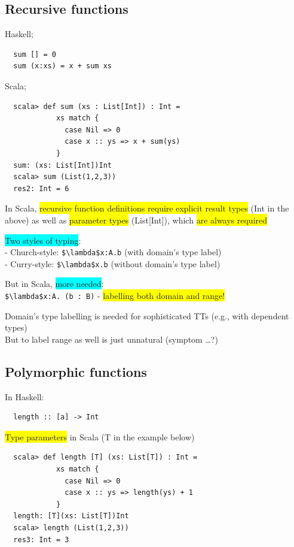 \documentclass[tikz,border=10pt]{project_plan}
\begin{document}
\subsection{Recursive functions}

Haskell;
\begin{lstlisting}
  sum [] = 0
  sum (x:xs) = x + sum xs
\end{lstlisting}

Scala;
\begin{lstlisting}
  scala> def sum (xs : List[Int]) : Int =
            xs match {
              case Nil => 0
              case x :: ys => x + sum(ys)
            }
  sum: (xs: List[Int])Int
  scala> sum (List(1,2,3))
  res2: Int = 6
\end{lstlisting}
In Scala, \colorbox{yellow}{recursive function definitions require explicit result types} (Int in the above) as well as \colorbox{yellow}{parameter types}
(List[Int]), which \colorbox{yellow}{are always required}

\colorbox{cyan}{Two styles of typing}:\\
- Church-style: \lstinline[mathescape]?$\lambda$x:A.b? (with domain’s type label)\\
- Curry-style: \lstinline[mathescape]?$\lambda$x.b? (without domain’s type label)

But in Scala, \colorbox{cyan}{more needed}:\\
\lstinline[mathescape]?$\lambda$x:A. (b : B)? - \colorbox{yellow}{labelling both domain and range!}

Domain’s type labelling is needed for sophisticated TTs (e.g., with dependent types)\\
But to label range as well is just unnatural (symptom …?)

\subsection{Polymorphic functions}

In Haskell:
\begin{lstlisting}
  length :: [a] -> Int
\end{lstlisting}
\colorbox{yellow}{Type parameters} in Scala (T in the example below)
\begin{lstlisting}
  scala> def length [T] (xs: List[T]) : Int =
            xs match {
              case Nil => 0
              case x :: ys => length(ys) + 1
            }
  length: [T](xs: List[T])Int
  scala> length (List(1,2,3))
  res3: Int = 3
\end{lstlisting}
\end{document}

